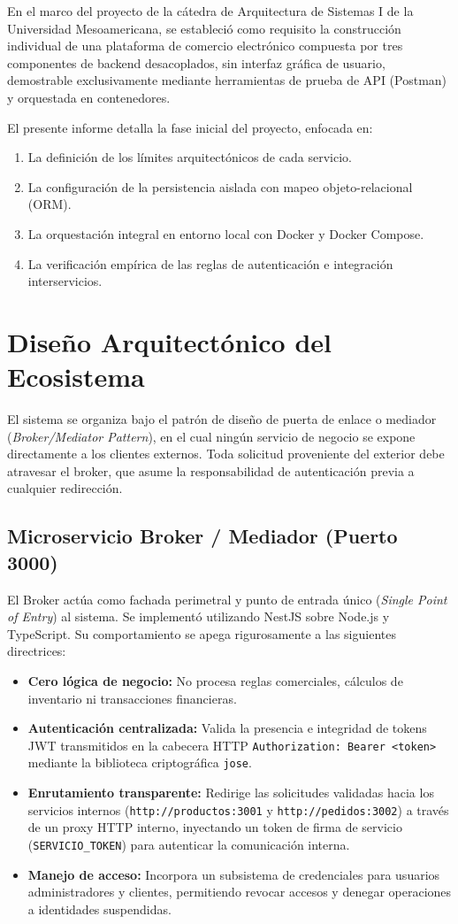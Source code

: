 \documentclass[conference]{IEEEtran}
\begin{document}
En el marco del proyecto de la cátedra de Arquitectura de Sistemas I de la Universidad Mesoamericana, se estableció como requisito la construcción individual de una plataforma de comercio electrónico compuesta por tres componentes de backend desacoplados, sin interfaz gráfica de usuario, demostrable exclusivamente mediante herramientas de prueba de API (Postman) y orquestada en contenedores. 

El presente informe detalla la fase inicial del proyecto, enfocada en:
\begin{enumerate}
    \item La definición de los límites arquitectónicos de cada servicio.
    \item La configuración de la persistencia aislada con mapeo objeto-relacional (ORM).
    \item La orquestación integral en entorno local con Docker y Docker Compose.
    \item La verificación empírica de las reglas de autenticación e integración interservicios.
\end{enumerate}

\section{Diseño Arquitectónico del Ecosistema}
El sistema se organiza bajo el patrón de diseño de puerta de enlace o mediador (\textit{Broker/Mediator Pattern}), en el cual ningún servicio de negocio se expone directamente a los clientes externos. Toda solicitud proveniente del exterior debe atravesar el broker, que asume la responsabilidad de autenticación previa a cualquier redirección.

\subsection{Microservicio Broker / Mediador (Puerto 3000)}
El Broker actúa como fachada perimetral y punto de entrada único (\textit{Single Point of Entry}) al sistema. Se implementó utilizando NestJS sobre Node.js y TypeScript. Su comportamiento se apega rigurosamente a las siguientes directrices:
\begin{itemize}
    \item \textbf{Cero lógica de negocio:} No procesa reglas comerciales, cálculos de inventario ni transacciones financieras.
    \item \textbf{Autenticación centralizada:} Valida la presencia e integridad de tokens JWT transmitidos en la cabecera HTTP \texttt{Authorization: Bearer <token>} mediante la biblioteca criptográfica \texttt{jose}.
    \item \textbf{Enrutamiento transparente:} Redirige las solicitudes validadas hacia los servicios internos (\texttt{http://productos:3001} y \texttt{http://pedidos:3002}) a través de un proxy HTTP interno, inyectando un token de firma de servicio (\texttt{SERVICIO\_TOKEN}) para autenticar la comunicación interna.
    \item \textbf{Manejo de acceso:} Incorpora un subsistema de credenciales para usuarios administradores y clientes, permitiendo revocar accesos y denegar operaciones a identidades suspendidas.
\end{itemize}
\end{document}

